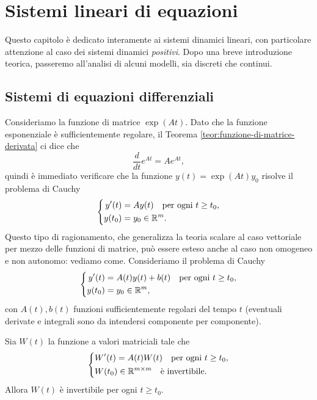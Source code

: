 \graphicspath{{./figures/capitolo5/}}
\lstset{inputpath = ./programs/capitolo5}

\chapter{Sistemi lineari di equazioni}

Questo capitolo è dedicato interamente ai sistemi dinamici lineari,
con particolare attenzione al caso dei sistemi dinamici \emph{positivi}.
Dopo una breve introduzione teorica, passeremo all'analisi
di alcuni modelli, sia discreti che continui.

\section{Sistemi di equazioni differenziali}

Consideriamo la funzione di matrice $\exp(At)$.
Dato che la funzione esponenziale è sufficientemente regolare,
il Teorema \ref{teor:funzione-di-matrice-derivata} ci dice che
\[
\frac{d}{dt} e^{At} = A e^{At},
\]
quindi è immediato verificare che la funzione $y(t) = \exp(At)y_0$
risolve il problema di Cauchy
\begin{equation}
\left\{
\begin{aligned}
y'(t)  &= Ay(t) \quad \text{per ogni $t \geq t_0$}, \\
y(t_0) &= y_0 \in \mathbb{R}^m.
\end{aligned}
\right.
\end{equation}
Questo tipo di ragionamento, che generalizza la teoria scalare al caso
vettoriale per mezzo delle funzioni di matrice, può essere esteso anche
al caso non omogeneo e non autonomo: vediamo come.
Consideriamo il problema di Cauchy
\begin{equation}\label{eq:problema-lineare-continuo}
\left\{
\begin{aligned}
y'(t)  &= A(t)y(t) + b(t) \quad \text{per ogni $t \geq t_0$}, \\
y(t_0) &= y_0 \in \mathbb{R}^m,
\end{aligned}
\right.
\end{equation}
con $A(t), b(t)$ funzioni sufficientemente regolari del tempo $t$
(eventuali derivate e integrali sono da intendersi componente per componente).

\begin{teor}
Sia $W(t)$ la funzione a valori matriciali tale che
\[
\left\{
\begin{aligned}
& W'(t) = A(t) W(t) \quad \text{per ogni $t \geq t_0$}, \\
& W(t_0) \in \mathbb{R}^{m \times m} \quad \text{è invertibile}.
\end{aligned}
\right.
\]
Allora $W(t)$ è invertibile per ogni $t \geq t_0$.
\end{teor}

